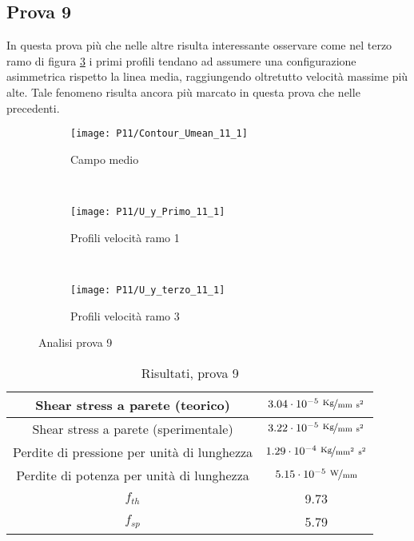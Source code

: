 \documentclass{article} %
\begin{document}
\subsection{Prova 9}
In questa prova più che nelle altre risulta interessante osservare come nel terzo ramo di figura \ref{fig:U3_y9} i primi profili tendano ad assumere una configurazione asimmetrica rispetto la linea media, raggiungendo oltretutto velocità massime più alte. Tale fenomeno risulta ancora più marcato in questa prova che nelle precedenti.
\begin{figure}[h]
	\centering
	\begin{subfigure}{0.29\textwidth}
		\texttt{[image: P11/Contour\_Umean\_11\_1]}
		\caption{Campo medio}
		\label{fig:MEAN_U9}
	\end{subfigure} ~ 
	\begin{subfigure}{0.29\textwidth}
		\texttt{[image: P11/U\_y\_Primo\_11\_1]}
		\caption{Profili velocità ramo 1}
		\label{fig:U1_y9}
	\end{subfigure} ~  
	\begin{subfigure}{0.29\textwidth}
		\texttt{[image: P11/U\_y\_terzo\_11\_1]}
		\caption{Profili velocità ramo 3}
		\label{fig:U3_y9}	
	\end{subfigure}  
	\caption{Analisi prova 9}
	\label{fig:9}
\end{figure}

\begin{table}[ht!]
	\centering
	\setlength \extrarowheight{3pt}
	\begin{tabular}{|c|c|}
		\hline
		Shear stress a parete (teorico) & $3.04 \cdot 10^{-5}\ \nicefrac{\rm Kg}{\rm mm\ s^2}$ \\ 
		\hline 
		Shear stress a parete (sperimentale) & $3.22 \cdot 10^{-5}\ \nicefrac{\rm Kg}{\rm mm\ s^2}$ \\ 
		\hline 
		Perdite di pressione per unità di lunghezza & $1.29 \cdot 10^{-4}\ \nicefrac{\rm Kg}{\rm mm^2\ s^2}$ \\ %
		\hline 
		Perdite di potenza per unità di lunghezza & $5.15 \cdot 10^{-5}\ \nicefrac{\rm W}{\rm mm}$ \\ 
		\hline 
		$f_{th}$ & 9.73 \\ 
		\hline 
		$f_{sp}$ & 5.79 \\ 
		\hline 
	\end{tabular}
	\caption{Risultati, prova 9}
	\label{tab:A9}
\end{table}
\end{document}
